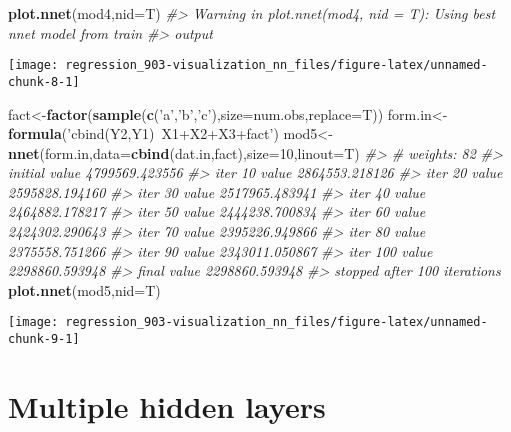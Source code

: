 \documentclass[]{book}
\newenvironment{Shaded}{\begin{snugshade}}{\end{snugshade}}
\newcommand{\CommentTok}[1]{\textcolor[rgb]{0.56,0.35,0.01}{\textit{#1}}}
\newcommand{\DataTypeTok}[1]{\textcolor[rgb]{0.13,0.29,0.53}{#1}}
\newcommand{\DecValTok}[1]{\textcolor[rgb]{0.00,0.00,0.81}{#1}}
\newcommand{\KeywordTok}[1]{\textcolor[rgb]{0.13,0.29,0.53}{\textbf{#1}}}
\newcommand{\NormalTok}[1]{#1}
\newcommand{\StringTok}[1]{\textcolor[rgb]{0.31,0.60,0.02}{#1}}
\begin{document}
\begin{Shaded}
\begin{Highlighting}[]
\KeywordTok{plot.nnet}\NormalTok{(mod4,}\DataTypeTok{nid=}\NormalTok{T)}
\CommentTok{#> Warning in plot.nnet(mod4, nid = T): Using best nnet model from train}
\CommentTok{#> output}
\end{Highlighting}
\end{Shaded}

\begin{center}\texttt{[image: regression\_903-visualization\_nn\_files/figure-latex/unnamed-chunk-8-1]} \end{center}

\begin{Shaded}
\begin{Highlighting}[]
\NormalTok{fact<-}\KeywordTok{factor}\NormalTok{(}\KeywordTok{sample}\NormalTok{(}\KeywordTok{c}\NormalTok{(}\StringTok{'a'}\NormalTok{,}\StringTok{'b'}\NormalTok{,}\StringTok{'c'}\NormalTok{),}\DataTypeTok{size=}\NormalTok{num.obs,}\DataTypeTok{replace=}\NormalTok{T))}
\NormalTok{form.in<-}\KeywordTok{formula}\NormalTok{(}\StringTok{'cbind(Y2,Y1)~X1+X2+X3+fact'}\NormalTok{)}
\NormalTok{mod5<-}\KeywordTok{nnet}\NormalTok{(form.in,}\DataTypeTok{data=}\KeywordTok{cbind}\NormalTok{(dat.in,fact),}\DataTypeTok{size=}\DecValTok{10}\NormalTok{,}\DataTypeTok{linout=}\NormalTok{T)}
\CommentTok{#> # weights:  82}
\CommentTok{#> initial  value 4799569.423556 }
\CommentTok{#> iter  10 value 2864553.218126}
\CommentTok{#> iter  20 value 2595828.194160}
\CommentTok{#> iter  30 value 2517965.483941}
\CommentTok{#> iter  40 value 2464882.178217}
\CommentTok{#> iter  50 value 2444238.700834}
\CommentTok{#> iter  60 value 2424302.290643}
\CommentTok{#> iter  70 value 2395226.949866}
\CommentTok{#> iter  80 value 2375558.751266}
\CommentTok{#> iter  90 value 2343011.050867}
\CommentTok{#> iter 100 value 2298860.593948}
\CommentTok{#> final  value 2298860.593948 }
\CommentTok{#> stopped after 100 iterations}
\KeywordTok{plot.nnet}\NormalTok{(mod5,}\DataTypeTok{nid=}\NormalTok{T)}
\end{Highlighting}
\end{Shaded}

\begin{center}\texttt{[image: regression\_903-visualization\_nn\_files/figure-latex/unnamed-chunk-9-1]} \end{center}

\hypertarget{multiple-hidden-layers}{%
\section{Multiple hidden layers}\label{multiple-hidden-layers}}
\end{document}

